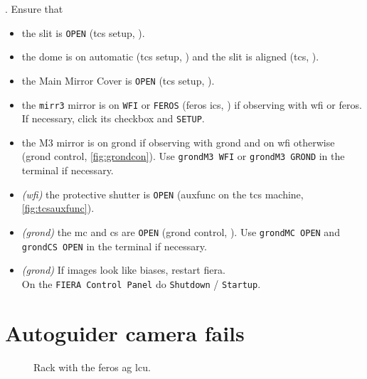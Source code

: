 \documentclass[11pt,fleqn,a4paper]{book}
\begin{document}
. Ensure that
\begin{itemize}
  \item the \gls{slit} is \texttt{OPEN} (\gls{tcs} setup, ).
  \item the dome is on automatic (\gls{tcs} setup,
        ) and the slit is aligned (\gls{tcs}, ).
  \item the Main Mirror Cover is \texttt{OPEN} (\gls{tcs} setup,
        ).
  \item the \texttt{\gls{mirr3}} mirror is on \texttt{WFI} or \texttt{FEROS} (\gls{feros} \gls{ics}, 
        ) if observing with \gls{wfi} or \gls{feros}.  If necessary,
        click its checkbox and \texttt{SETUP}.
  \item the \gls{M3} mirror is on \gls{grond} if observing with \gls{grond} and on \gls{wfi} otherwise
         (\gls{grond} control, \ref{fig:grondcon}).  Use 
        \texttt{\gls{grondM3} WFI} or \texttt{\gls{grondM3} GROND} in the terminal if
        necessary.
  \item \textit{(\gls{wfi})} the \gls{protective shutter} is \texttt{OPEN} (\gls{auxfunc} 
        on the \gls{tcs} machine, \ref{fig:tcsauxfunc}). 
  \item \textit{(\gls{grond})} the \gls{mc} and \gls{cs} are \texttt{OPEN} (\gls{grond} control,
        ).  Use \texttt{\gls{grondMC} OPEN} and \texttt{\gls{grondCS} OPEN} in the terminal if necessary.
  \item \textit{(\gls{grond})} If images look like biases, restart \gls{fiera}.\\
  On the \texttt{FIERA Control Panel} do \texttt{Shutdown} / \texttt{Startup}.
\end{itemize}

\section{Autoguider camera fails}
\label{sec:agfail}

\begin{figure}[p!]
\hfill
{}\hfill
{}
\caption[Rack with FEROS AG LCU]{Rack with the \gls{feros} \gls{ag} \gls{lcu}.}
\label{fig:l2p2cam}
\end{figure}
\end{document}
